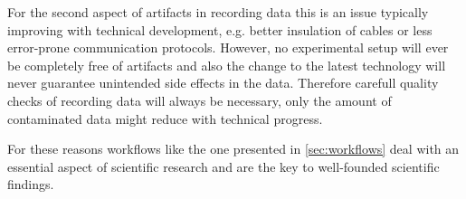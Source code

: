 For the second aspect of artifacts in recording data this is an issue typically improving with technical development, e.g. better insulation of cables or less error-prone communication protocols. However, no experimental setup will ever be completely free of artifacts and also the change to the latest technology will never guarantee unintended side effects in the data. Therefore carefull quality checks of recording data will always be necessary, only the amount of contaminated data might reduce with technical progress.

For these reasons workflows like the one presented in \cref{sec:workflows} deal with an essential aspect of scientific research and are the key to well-founded scientific findings.
